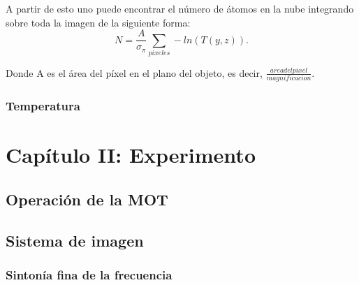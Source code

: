 \documentclass[12pt,twoside]{article}
\begin{document}
A partir de esto uno puede encontrar el número de átomos en la nube integrando sobre toda la imagen de la siguiente forma:
\begin{equation}
N = \frac{A}{\sigma_\pi} \sum_{pixeles} -ln(T(y,z)).
\end{equation}

Donde A es el área del píxel en el plano del objeto, es decir, $\frac{area del pixel}{magnificacion}$.

\subsubsection{Temperatura}\label{teotemp}


\section{Capítulo II: Experimento}\label{experimento}

\subsection{Operación de la MOT}\label{operacion}



\subsection{Sistema de imagen}\label{Sisimag}

\subsubsection{Sintonía fina de la frecuencia}\label{Sintonia}
\end{document}
